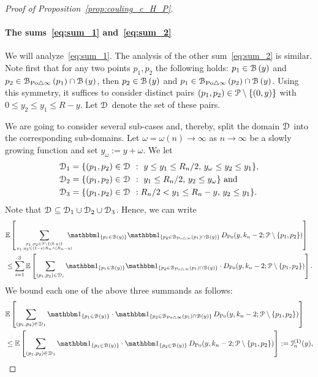 \begin{proof}[Proof of Proposition~\ref{prop:couling_c_H_P}]
\paragraph{The sums~\eqref{eq:sum_1} and~\eqref{eq:sum_2}}

We will analyze~\eqref{eq:sum_1}. The analysis of the other sum~\eqref{eq:sum_2} is similar.
Note first that for any two points $p_1,p_2$ the following holds: $p_1 \in {\mathcal B}\left(y\right)$ and $p_2 \in {\mathcal B}_{{\mathrm{Po}} \bigtriangleup \infty}\left(p_1\right)\cap {\mathcal B}\left(y\right)$, then $p_2 \in {\mathcal B}\left(y\right)$ and $p_1 \in {\mathcal B}_{{\mathrm{Po}} \bigtriangleup \infty}\left(p_2\right)\cap {\mathcal B}\left(y\right)$.
Using this symmetry, it suffices to consider distinct pairs $(p_1,p_2) \in {\mathcal P} \setminus \{(0,y)\}$ with $0\leq y_2 \leq y_1 \leq R- y$. Let $\mathcal{D}_{}$ denote the set of these pairs. 

We are going to consider several sub-cases and, thereby, split the domain $\mathcal{D}_{}$ into the corresponding sub-domains. 
Let $\omega =\omega (n) \to \infty$ as $n\to \infty$ be a slowly growing function and set $y_\omega := y +\omega$. 
We let 
\begin{align*}
	\mathcal{D}_{1} &= \{(p_1,p_2) \in \mathcal{D}_{} \ : \ y \leq y_1 \leq R_n/2, \, y_\omega \leq y_2 \leq y_1 \},\\
	\mathcal{D}_{2} &= \{(p_1,p_2) \in \mathcal{D}_{} \ : \ y_1 \leq R_n/2, \, y_2 \leq y_\omega \} \text{ and }\\
	\mathcal{D}_{3} &=  \{(p_1,p_2) \in \mathcal{D}_{} \ : R_n/2 < y_1 \leq R_n -y, \, y_2 \leq y_1 \}.
\end{align*} 
Note that $\mathcal{D}_{} \subseteq \mathcal{D}_{1} \cup \mathcal{D}_{2}\cup \mathcal{D}_{3}$.
Hence, we can write 
\begin{equation} \label{eq:1sum-rewriting}
\begin{split} 
	&\Exp{\sum_{p_1, p_2\in \Pcal \setminus \{(0,y)\} 
	\atop y_1, y_2 \leq (1-\eps) R_n\wedge (R_n-y)} \hspace{-10pt} \ind{p_1 \in \BallHyp{y}} 
	\ind{p_2 \in \BallSym{p_1}\cap \BallHyp{y}} 
	\, D_{\Po} (y,k_n-2;\Pcal \setminus \{p_1,p_2\})} \\ 
	&\le \sum_{i=1}^3 \Exp{\sum_{(p_1, p_2)\in \dom{i}} \ind{p_1 \in \BallHyp{y}} 
	\ind{p_2 \in \BallSym{p_1}\cap \BallHyp{y}} \cdot D_{\Po} (y,k_n-2;\Pcal \setminus \{p_1,p_2\})}.
\end{split}
\end{equation}
We bound each one of the above three summands as follows:  
\begin{equation} \label{eq:term1}
\begin{split}
	&\Exp{\sum_{(p_1, p_2)\in \dom{1}} \ind{p_1 \in \BallHyp{y}} \cdot \ind{p_2 \in \BallSym{p_1}\cap \BallHyp{y}} 
		\, D_{\Po} (y,k_n-2;\Pcal \setminus \{p_1,p_2\})} \\
	&\le \Exp{\sum_{(p_1, p_2)\in \dom{1}} \ind{p_1 \in \BallHyp{y}} \cdot \ind{p_2 \in  \BallHyp{y}} 
		\, D_{\Po} (y,k_n-2;\Pcal \setminus \{p_1,p_2\})} := \mathcal{I}_n^{(1)}(y),
\end{split}
\end{equation}


\end{proof}
